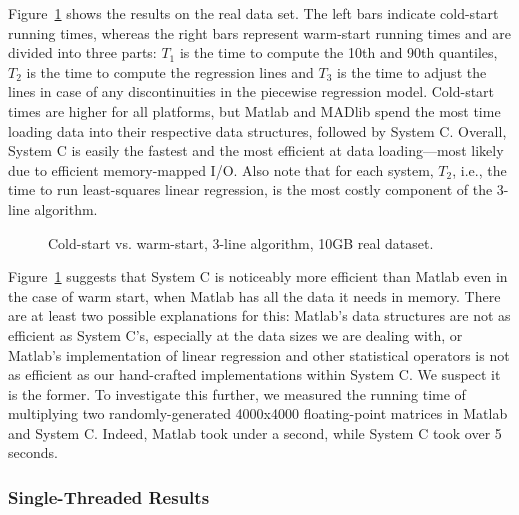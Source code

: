 \documentclass[prodmode,acmtods]{acmsmall}
\begin{document}
Figure~\ref{fig:threelbar10G} shows the results on the real data set.  The left bars indicate cold-start running times, whereas the right bars represent warm-start running times and are divided into three parts: $T_1$ is the time to compute the 10th and 90th quantiles, $T_2$ is the time to compute the regression lines and $T_3$ is the time to adjust the lines in case of any discontinuities in the piecewise regression model.  Cold-start times are higher for all platforms, but Matlab and MADlib spend the most time loading data into their respective data structures, followed by System C.  Overall, System C is easily the fastest and the most efficient at data loading---most likely due to efficient memory-mapped I/O.  Also note that for each system, $T_2$, i.e., the time to run least-squares linear regression, is the most costly component of the 3-line algorithm.

\begin{figure}[t]
\centering
{}
\caption{Cold-start vs. warm-start, 3-line algorithm, 10GB real dataset.}
\label{fig:threelbar10G}
\end{figure}

Figure~\ref{fig:threelbar10G} suggests that System C is noticeably more efficient than Matlab even in the case of warm start, when Matlab has all the data it needs in memory.  There are at least two possible explanations for this: Matlab's data structures are not as efficient as System C's, especially at the data sizes we are dealing with, or Matlab's implementation of linear regression and other statistical operators is not as efficient as our hand-crafted implementations within System C.  We suspect it is the former.  To investigate this further, we measured the running time of multiplying two randomly-generated 4000x4000 floating-point matrices in Matlab and System C.  Indeed, Matlab took under a second, while System C took over 5 seconds.


\subsubsection{Single-Threaded Results}
\label{sec:singleprocess}
\end{document}
